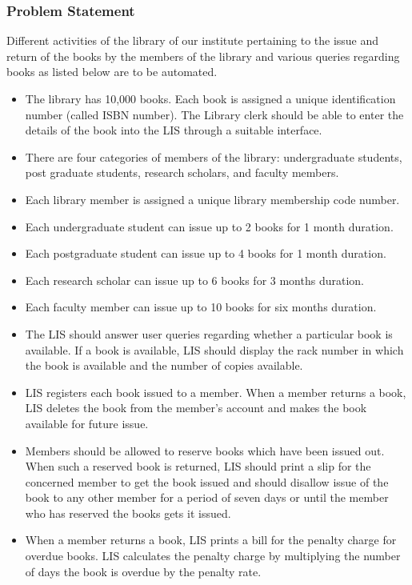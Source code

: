 \documentclass{article}
\begin{document}
\subsubsection*{Problem Statement}
Different activities of the library of our institute pertaining to the issue and return of the books by the members
of the library and various queries regarding books as listed below are to be automated.
\begin{itemize}


\item The library has 10,000 books. Each book is assigned a unique identification number (called ISBN number).
The Library clerk should be able to enter the details of the book into the LIS through a suitable interface.
\item There are four categories of members of the library: undergraduate students, post graduate students,
research scholars, and faculty members.
\item Each library member is assigned a unique library membership code number.
\item Each undergraduate student can issue up to 2 books for 1 month duration.
\item Each postgraduate student can issue up to 4 books for 1 month duration.
\item Each research scholar can issue up to 6 books for 3 months duration.
\item Each faculty member can issue up to 10 books for six months duration.
\item The LIS should answer user queries regarding whether a particular book is available. If a book is available,
LIS should display the rack number in which the book is available and the number of copies available.
\item LIS registers each book issued to a member. When a member returns a book, LIS deletes the book from
the member’s account and makes the book available for future issue.
\item Members should be allowed to reserve books which have been issued out. When such a reserved book is
returned, LIS should print a slip for the concerned member to get the book issued and should disallow
issue of the book to any other member for a period of seven days or until the member who has reserved
the books gets it issued.
\item When a member returns a book, LIS prints a bill for the penalty charge for overdue books. LIS calculates
the penalty charge by multiplying the number of days the book is overdue by the penalty rate.

\end{itemize}
\end{document}
